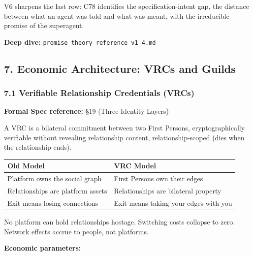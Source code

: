 \documentclass[
  11pt,
]{article}
\newcounter{none} %
\begin{document}
V6 sharpens the last row: C78 identifies the specification-intent gap,
the distance between what an agent was told and what was meant, with the
irreducible promise of the superagent.

\textbf{Deep dive:} \texttt{promise\_theory\_reference\_v1\_4.md}

\subsection{7. Economic Architecture: VRCs and
Guilds}\label{economic-architecture-vrcs-and-guilds}

\subsubsection{7.1 Verifiable Relationship Credentials
(VRCs)}\label{verifiable-relationship-credentials-vrcs}

\textbf{Formal Spec reference:} §19 (Three Identity Layers)

A VRC is a bilateral commitment between two First Persons,
cryptographically verifiable without revealing relationship content,
relationship-scoped (dies when the relationship ends).

{\def\LTcaptype{none} %
\begin{longtable}[]{@{}
  >{\raggedright\arraybackslash}p{}
  >{\raggedright\arraybackslash}p{}@{}}
\toprule\noalign{}
\begin{minipage}[b]{\linewidth}\raggedright
Old Model
\end{minipage} & \begin{minipage}[b]{\linewidth}\raggedright
VRC Model
\end{minipage} \\
\midrule\noalign{}
\endhead
\bottomrule\noalign{}
\endlastfoot
Platform owns the social graph & First Persons own their edges \\
Relationships are platform assets & Relationships are bilateral
property \\
Exit means losing connections & Exit means taking your edges with you \\
\end{longtable}
}

No platform can hold relationships hostage. Switching costs collapse to
zero. Network effects accrue to people, not platforms.

\textbf{Economic parameters:}
\end{document}
